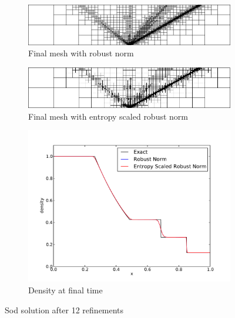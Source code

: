 \documentclass[Dissertation.tex]{subfiles}
\begin{document}
\begin{figure}[ht]
\centering
\begin{subfigure}[t]{0.9\textwidth}
\centering
\includegraphics[width=\textwidth]{Dissertation/Sod/Robust-meshonly12.png}
\caption{Final mesh with robust norm}
\end{subfigure}
\begin{subfigure}[t]{0.9\textwidth}
\centering
\includegraphics[width=\textwidth]{Dissertation/Sod/EntropyRobust-meshonly12.png}
\caption{Final mesh with entropy scaled robust norm}
\end{subfigure}
\begin{subfigure}[t]{0.9\textwidth}
\centering
\includegraphics[width=\textwidth]{Dissertation/Sod/EntropyNormComparison-den.pdf}
\caption{Density at final time}
\end{subfigure}
\caption{Sod solution after 12 refinements}
\label{fig:SodEntropyComparison}
\end{figure}
\end{document}
